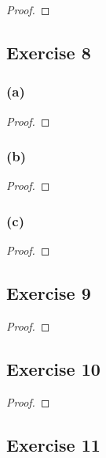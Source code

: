 \documentclass[14pt]{extarticle}
\begin{document}
\begin{proof}

\end{proof}

\subsection{Exercise 8}

\subsubsection{(a)}

\begin{proof}

\end{proof}

\subsubsection{(b)}

\begin{proof}

\end{proof}

\subsubsection{(c)}

\begin{proof}

\end{proof}

\subsection{Exercise 9}

\begin{proof}

\end{proof}

\subsection{Exercise 10}

\begin{proof}

\end{proof}

\subsection{Exercise 11}
\end{document}
